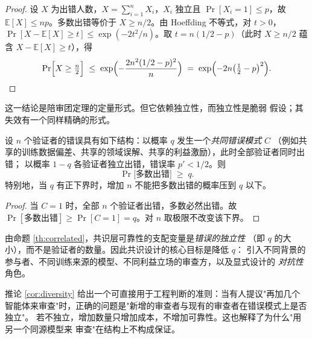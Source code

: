 \begin{proof}
设 $X$ 为出错人数，$X = \sum_{i=1}^{n} X_i$，$X_i$ 独立且
$\Pr[X_i = 1] \le p$，故 $\mathbb{E}[X] \le np$。多数出错等价于
$X \ge n/2$。由 Hoeffding 不等式\cite{hoeffding1963}，对 $t > 0$，
$\Pr[X - \mathbb{E}[X] \ge t] \le \exp(-2t^{2}/n)$。取
$t = n(1/2 - p)$（此时 $X \ge n/2$ 蕴含 $X - \mathbb{E}[X] \ge t$），得
\[
\Pr\Bigl[X \ge \tfrac{n}{2}\Bigr] \;\le\;
\exp\Bigl(-\frac{2n^{2}(1/2 - p)^{2}}{n}\Bigr) \;=\;
\exp\Bigl(-2n\bigl(\tfrac{1}{2} - p\bigr)^{2}\Bigr). \qedhere
\]
\end{proof}

这一结论是陪审团定理\cite{condorcet1785}的定量形式。但它依赖独立性，而独立性是脆弱
假设；其失效有一个同样精确的形式。

\begin{proposition}[相关错误模式支配界]\label{th:correlated}
设 $n$ 个验证者的错误具有如下结构：以概率 $q$ 发生一个\emph{共同错误模式} $C$
（例如共享的训练数据偏差、共享的领域误解、共享的利益激励），此时全部验证者同时出错；
以概率 $1-q$ 各验证者独立出错，错误率 $p' < 1/2$。则
\begin{equation}\label{eq:correlated}
\Pr\bigl[\text{多数出错}\bigr] \;\ge\; q .
\end{equation}
特别地，当 $q$ 有正下界时，增加 $n$ 不能把多数出错的概率压到 $q$ 以下。
\end{proposition}

\begin{proof}
当 $C = 1$ 时，全部 $n$ 个验证者出错，多数必然出错。故
$\Pr[\text{多数出错}] \ge \Pr[C = 1] = q$。对 $n$ 取极限不改变该下界。
\end{proof}

\begin{corollary}[多样性而非数量]\label{cor:diversity}
由命题 \ref{th:correlated}，共识层可靠性的支配变量是\emph{错误的独立性}
（即 $q$ 的大小），而不是验证者的数量。因此共识设计的核心目标是降低 $q$：
引入不同背景的参与者、不同训练来源的模型、不同利益立场的审查方，以及显式设计的
\emph{对抗性}角色。
\end{corollary}

\begin{remark}[这一结论的用途]\label{rmk:diversity-use}
推论 \ref{cor:diversity} 给出一个可直接用于工程判断的准则：当有人提议"再加几个
智能体来审查"时，正确的问题是"新增的审查者与现有的审查者在错误模式上是否独立"。
若不独立，增加数量只增加成本，不增加可靠性。这也解释了为什么"用另一个同源模型来
审查"在结构上不构成保证。
\end{remark}

